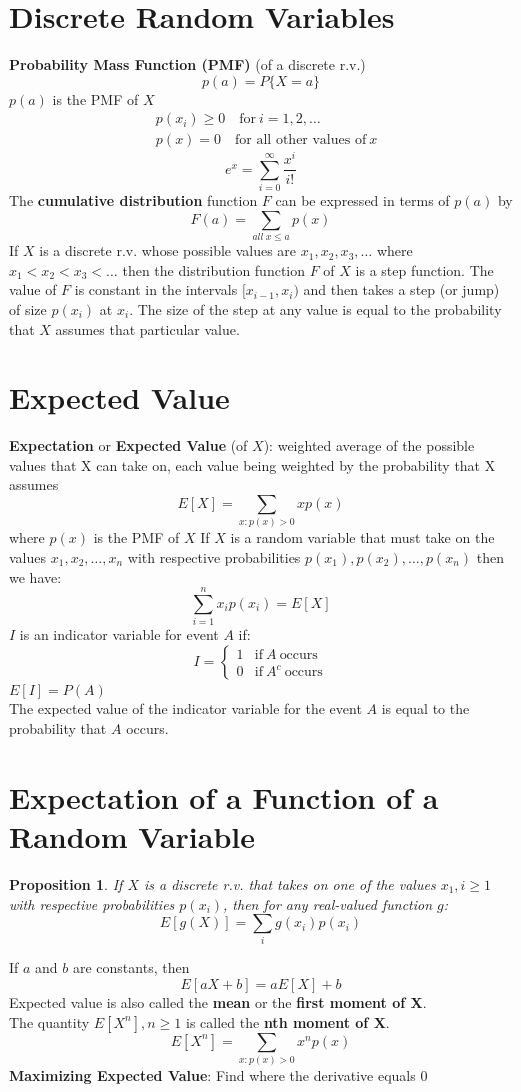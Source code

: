 \documentclass[openany]{book}
\numberwithin{equation}{section}
\newtheorem{proposition}{Proposition}[section]
\begin{document}
\begin{flushleft}
\section{Discrete Random Variables}
\textbf{Probability Mass Function (PMF)} (of a discrete r.v.)
\[p(a)=P\{X=a\}
\]
$p(a)$ is the PMF of $X$
\begin{align*}
&p(x_i)\geq 0 \quad \text{for} \ i=1,2,\dots\\
&p(x) = 0 \quad \text{for all other values of} \ x
\end{align*}
\[e^x=\sum_{i=0}^{\infty}\frac{x^i}{i!}
\]
The \textbf{cumulative distribution} function $F$ can be expressed in terms of $p(a)$ by 
\[F(a)=\sum_{all \ x\leq a}p(x)
\]
If $X$ is a discrete r.v. whose possible values are $x_1,x_2,x_3,\dots$ where $x_1<x_2<x_3<\dots$ then the distribution function $F$ of $X$ is a step function.
The value of $F$ is constant in the intervals $[x_{i-1},x_i)$
and then takes a step (or jump) of size $p(x_i)$ at $x_i$.\medbreak
The size of the step at any value is equal to the
probability that $X$ assumes that particular value.
\section{Expected Value}
\textbf{Expectation} or \textbf{Expected Value} (of $X$): weighted average of the possible values that X can take on, each value being weighted by the probability that X assumes
\[E[X]=\sum_{x:p(x)>0}xp(x)
\]
where $p(x)$ is the PMF of $X$ \medbreak
If $X$ is a random variable that must take on the values $x_1,x_2,\dots,x_n$ with respective probabilities $p(x_1),p(x_2),\dots,p(x_n)$ then we have: 
\[\sum_{i=1}^{n}x_ip(x_i)=E[X]
\]
$I$ is an indicator variable for event $A$ if:
\[I=
\begin{cases}
1 & \text{if} \ A \ \text{occurs}\\
0 & \text{if} \ A^c \ \text{occurs}
\end{cases}
\]
$E[I]=P(A)$\\
The expected value of the indicator variable for the event $A$ is equal to the probability that $A$ occurs.
\section{Expectation of a Function of a Random Variable}
\begin{proposition}
If $X$ is a discrete r.v. that takes on one of the values $x_1, i\geq 1$ with respective probabilities $p(x_i)$, then for any real-valued function $g$:
\[E[g(X)]=\sum_{i}g(x_i)p(x_i)
\]
\end{proposition}
If $a$ and $b$ are constants, then
\[E[aX+b]=aE[X]+b
\]
Expected value is also called the \textbf{mean} or the \textbf{first moment of X}. \\
The quantity $E[X^n], n\geq 1$ is called the \textbf{nth moment of X}.
\[E[X^n]=\sum_{x:p(x)>0}x^np(x)
\]
\textbf{Maximizing Expected Value}: Find where the derivative equals 0

\end{flushleft}
\end{document}
